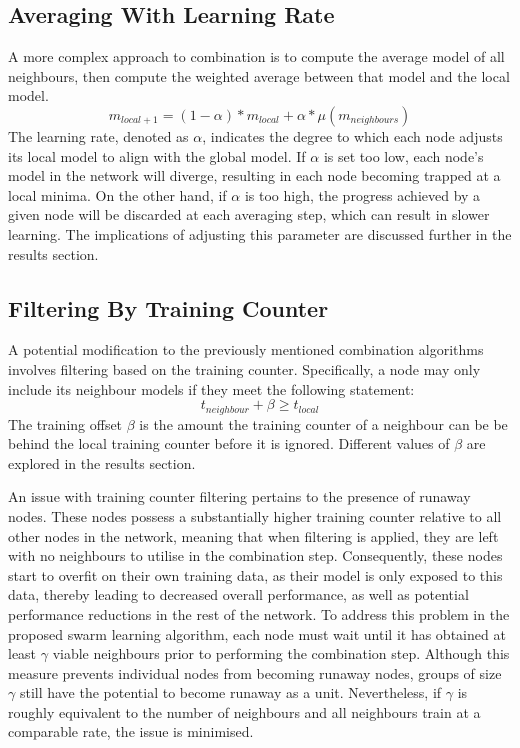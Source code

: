 \subsection{Averaging With Learning Rate}
A more complex approach to combination is to compute the average model of all neighbours, then compute the weighted average between that model and the local model.
\[ m_{local+1} = (1 - \alpha) * m_{local} + \alpha * \mu ( m_{neighbours} )\]
The learning rate, denoted as $\alpha$, indicates the degree to which each node adjusts its local model to align with the global model. If $\alpha$ is set too low, each node's model in the network will diverge, resulting in each node becoming trapped at a local minima. On the other hand, if $\alpha$ is too high, the progress achieved by a given node will be discarded at each averaging step, which can result in slower learning. The implications of adjusting this parameter are discussed further in the results section.

\subsection{Filtering By Training Counter}
A potential modification to the previously mentioned combination algorithms involves filtering based on the training counter. Specifically, a node may only include its neighbour models if they meet the following statement:
\[t_{neighbour} + \beta \ge t_{local} \]
The training offset $\beta$ is the amount the training counter of a neighbour can be be behind the local training counter before it is ignored. Different values of $\beta$ are explored in the results section.

An issue with training counter filtering pertains to the presence of runaway nodes. These nodes possess a substantially higher training counter relative to all other nodes in the network, meaning that when filtering is applied, they are left with no neighbours to utilise in the combination step. Consequently, these nodes start to overfit on their own training data, as their model is only exposed to this data, thereby leading to decreased overall performance, as well as potential performance reductions in the rest of the network. To address this problem in the proposed swarm learning algorithm, each node must wait until it has obtained at least $\gamma$ viable neighbours prior to performing the combination step. Although this measure prevents individual nodes from becoming runaway nodes, groups of size $\gamma$ still have the potential to become runaway as a unit. Nevertheless, if $\gamma$ is roughly equivalent to the number of neighbours and all neighbours train at a comparable rate, the issue is minimised.

